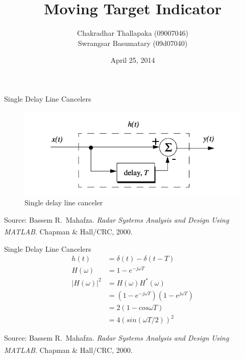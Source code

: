 \documentclass[mathserif]{beamer}
\title{Moving Target Indicator}
\author{Chakradhar Thallapaka (09007046) \\ Swrangsar Basumatary (09d07040) }
\institute{Department of Electrical Engineering \\ IIT Bombay, Powai}
\date{April 25, 2014}
\begin{document}
    \frame{\titlepage}
    
    \begin{frame}{Single Delay Line Cancelers}
    	\begin{figure}[h]
		\centering
		\includegraphics[width=\linewidth]{singleDLC} 
		\caption{Single delay line canceler}
	\end{figure}
		\tiny{Source: Bassem R.~Mahafza. \emph{Radar Systems Analysis and Design Using MATLAB\textsuperscript{\textregistered}}. Chapman \& Hall/CRC, 2000.}

    \end{frame}
    
    
    \begin{frame}{Single Delay Line Cancelers}
   	\begin{align}
    	 h(t) & = \delta(t) - \delta(t-T) \nonumber \\
    	 H(\omega) & = 1 - e^{-j\omega T} \nonumber \\
    	 |H(\omega)|^2 & = H(\omega)H^*(\omega) \nonumber \\
    	 & = (1 - e^{-j\omega T})(1 - e^{j\omega T}) \nonumber \\
    	 & = 2(1-cos\omega T) \nonumber \\
    	 & = 4(sin(\omega T/2))^2 \nonumber
    	\end{align}
    	
    	\vfill
    	\tiny{Source: Bassem R.~Mahafza. \emph{Radar Systems Analysis and Design Using MATLAB\textsuperscript{\textregistered}}. Chapman \& Hall/CRC, 2000.}

    \end{frame}
    
\end{document}
